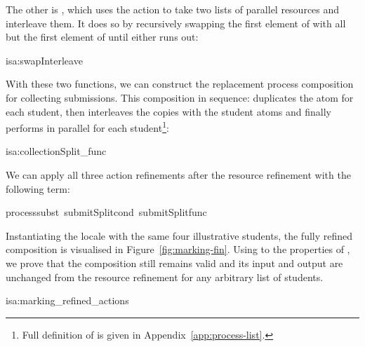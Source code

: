\documentclass[class=smolathesis,crop=false]{standalone}
\begin{document}
The other is , which uses the  action to take two lists of parallel resources and interleave them.
It does so by recursively swapping the first element of  with all but the first element of  until either runs out:
\begin{isadef}{isa:swapInterleave}
  
\end{isadef}

With these two functions, we can construct the replacement process composition for collecting submissions.
This composition in sequence: duplicates the  atom for each student, then interleaves the copies with the student atoms and finally performs  in parallel for each student\footnote{Full definition of  is given in Appendix~\ref{app:process-list}.}:
\begin{isadef}{isa:collectionSplit_func}
  
\end{isadef}

We can apply all three action refinements after the resource refinement with the following term:
\begin{center}
  \begin{minipage}{0.8\textwidth}
    \begin{isabelle}
      process{\isacharunderscore}subst\ submitSplit{\isacharunderscore}cond\ submitSplit{\isacharunderscore}func\isanewline
    \end{isabelle}
  \end{minipage}
\end{center}

Instantiating the locale with the same four illustrative students, the fully refined composition is visualised in Figure~\ref{fig:marking-fin}.
Using to the properties of , we prove that the composition still remains valid and its input and output are unchanged from the resource refinement for any arbitrary list of students.
\begin{isalemma}{isa:marking_refined_actions}
  
\end{isalemma}
\end{document}
